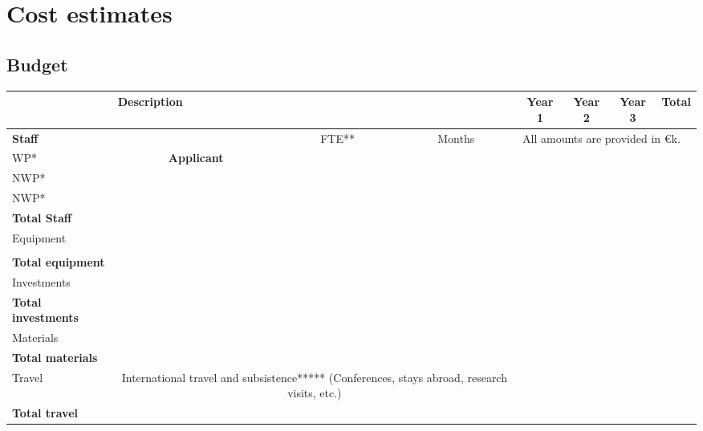 \section{Cost estimates}

\subsection{Budget}\label{sec:budget}

\begin{table}[h!]
\begin{tabular}{p{8.5em}ccccccc}
\hline\hline
\rowcolor[gray]{0.7}\T\B&\multicolumn{3}{l}{\textbf{Description}}&\textbf{Year
1} &\textbf{Year 2}&\textbf{Year 3}&\textbf{Total} \\
\hline\hline
\rowcolor[gray]{0.7} \T\B\textbf{Staff} & & FTE** &
Months&\multicolumn{4}{l}{All amounts are provided in \euro k.}\\
\T\B\cellcolor[gray]{0.7}\T\B WP*& \textbf{Applicant} &  &  &  &  &  &  \\
\T\B\cellcolor[gray]{0.7}\T\B NWP*&  &   &  & &  &  & \\
\T\B\cellcolor[gray]{0.7}\T\B NWP*&  &   &  & & & & \\
\hline
\T\B\cellcolor[gray]{0.7}\T\B\textbf{Total Staff}&  &  & & \textbf{} & \textbf{} & \textbf{} \\
\hline\hline
\cellcolor[gray]{0.7}\T\B Equipment & \multicolumn{3}{p{5.7cm}}{} &  & & & \\
\cellcolor[gray]{0.7}\T\B  & \multicolumn{3}{p{5.7cm}}{} &  &  &  & \\
\hline
\cellcolor[gray]{0.7}\T\B \textbf{Total equipment} & & & & \textbf{}& \textbf{}& \textbf{}& \textbf{}\\
\hline\hline
\cellcolor[gray]{0.7}\T\B Investments &\multicolumn{3}{p{5.7cm}}{} & & &  & \\
\hline
\cellcolor[gray]{0.7}\T\B \textbf{Total investments} & & & & \textbf{} & \textbf{} & \textbf{}& \textbf{}\\
\hline\hline
\cellcolor[gray]{0.7}\T\B Materials & & & & & & & \\
\hline
\cellcolor[gray]{0.7}\T\B \textbf{Total materials} & & & & & & & \textbf{}\\
\hline\hline
\cellcolor[gray]{0.7}\T\B Travel & \multicolumn{3}{p{6cm}}{International travel and subsistence***** (Conferences, stays abroad, research visits, etc.)} &  & 
&  &  \\
\hline
\cellcolor[gray]{0.7}\T\B \textbf{Total travel} &&&& \textbf{} & \textbf{} & \textbf{} & \textbf{} \\

\end{tabular}
\end{table}
